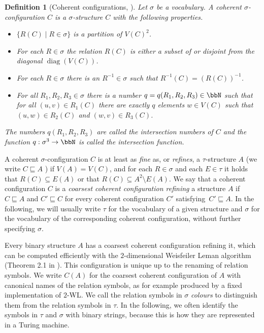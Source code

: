 \documentclass[10pt,a4paper]{article}
\newtheorem{definition}[theorem]{Definition}
\newcommand{\diag}{{\operatorname{diag}}}
\begin{document}
	\begin{definition}[Coherent configurations, \cite{dwl}]
		\label{def:PC_coherentConfig}
		Let $\sigma$ be a vocabulary.
		A \emph{coherent $\sigma$-configuration} $C$ is a $\sigma$-structure $C$
		with the following properties.
		\begin{itemize}
			\item $\{R(C) \mid R\in\sigma \}$ is a partition of $V(C)^2$.
			\item For each $R \in\sigma$ the relation $R(C)$ is either a
			subset of or disjoint from the diagonal $\diag(V(C))$.
			\item For each $R\in\sigma$ there is an
			$R^{-1}\in\sigma$ such that ${R^{-1}}(C)= (R(C))^{-1}$.
			\item For all $R_1,R_2,R_3\in\sigma$ there is a number
			$q = q(R_1, R_2 ,R_3)\in\bbN$ such that for all $(u,v)\in R_1(C)$ there are
			exactly $q$ elements $w \in V(C)$ such that $(u,w)\in R_2(C)$ and $(w,v)\in
			R_3(C)$.
		\end{itemize}
		The numbers $q(R_1,R_2,R_3)$ are called the \emph{intersection numbers} of
		$C$ and the function $q:\sigma^3\to \bbN$ is called the
		\emph{intersection function}.\\
	\end{definition}
	\vspace{-0.2cm}
	A coherent $\sigma$-configuration $C$ is at least as
	\emph{fine} as, or \emph{refines}, a
	$\tau$-structure $A$ (we write $C \sqsubseteq A$ ) if $V(A) = V(C)$, and for each $R\in\sigma$
	and each $E\in\tau$
	it holds that $R(C) \subseteq E(A)$ or that
	$R(C)\subseteq A^2\setminus E(A)$.
	We say that a coherent configuration $C$ is a \emph{coarsest coherent configuration refining} a
	structure $A$ if $C \sqsubseteq A$ and $C'\sqsubseteq C$ for every coherent
	configuration $C'$ satisfying~$C'\sqsubseteq A$. In the following, we will usually write $\tau$ for the vocabulary of a given structure and $\sigma$ for the vocabulary of the corresponding coherent configuration, without further specifying $\sigma$.

	Every binary structure $A$ has a coarsest coherent configuration refining it, which can be computed efficiently with the $2$-dimensional Weisfeiler Leman algorithm (Theorem 2.1 in \cite{dwl}). This configuration is unique up to the renaming of relation symbols. We write $C(A)$ for the coarsest coherent configuration of $A$ with canonical names of the relation symbols, as for example produced by a fixed implementation of $2$-WL. 
	We call the relation symbols in $\sigma$ \emph{colours} to distinguish them from the relation symbols in $\tau$. In the following, we often identify the symbols in $\tau$ and $\sigma$ with binary strings, because this is how they are represented in a Turing machine.
\end{document}

